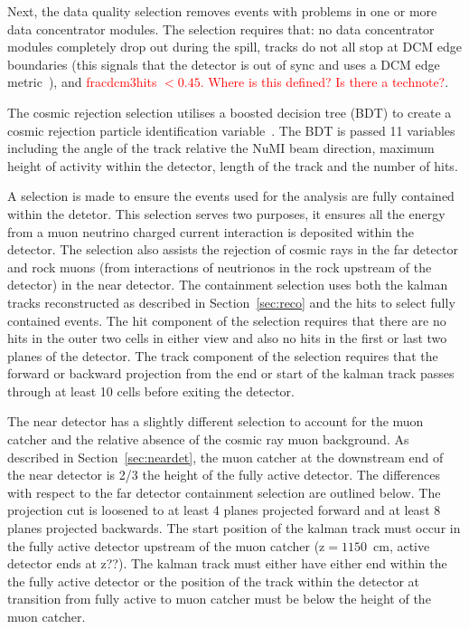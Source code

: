 Next, the data quality selection removes events with problems in one
or more data concentrator modules. 
The selection requires that: no data concentrator modules completely
drop out during the spill, tracks do not all stop at DCM edge
boundaries (this signals that the detector is out of sync and uses a
DCM edge metric~\cite{DCMEdgeMetric}), and
\textcolor{red}{fracdcm3hits $< 0.45$. Where is this defined? Is there
  a technote?}.

The cosmic rejection selection utilises a boosted decision tree (BDT)
to create a cosmic rejection particle identification
variable~\cite{CosRejTechnote}. 
The BDT is passed 11 variables including the angle of the track
relative the NuMI beam direction, maximum height of activity within
the detector, length of the track and the number of hits.

A selection is made to ensure the events used for the analysis are
fully contained within the detetor. This selection serves two
purposes, it ensures all the energy from a muon neutrino charged
current interaction is deposited within the detector. The selection
also assists the rejection of cosmic rays in the far detector and rock
muons (from interactions of neutrionos in the rock upstream of the
detector) in the near detector.
The containment selection uses both the kalman tracks reconstructed as
described in Section~\ref{sec:reco} and the hits to select fully
contained events.
The hit component of the selection requires that there are no hits in
the outer two cells in either view and also no hits in the first or last
two planes of the detector.
The track component of the selection
requires that the forward or backward projection from the end or start
of the kalman track passes through at least 10 cells before exiting
the detector. 

The near detector has a slightly different selection to account for
the muon catcher and the relative absence of the cosmic ray muon
background. As described in Section~\ref{sec:neardet}, the
muon catcher at the downstream end of the near detector is 2/3 the
height of the fully active detector. The differences with respect to
the far detector containment selection are outlined below.
The projection cut is loosened to at least
4 planes projected forward and at least 8 planes projected
backwards. 
The start position of the
kalman track must occur in the fully active detector upstream of the
muon catcher (z$=1150$~cm, active detector ends at z??). 
The kalman track must either have either end within the the
fully active detector or the position of the track within the detector
at transition from fully active to muon catcher must be below the
height of the muon catcher.
~\cite{SASummary}


